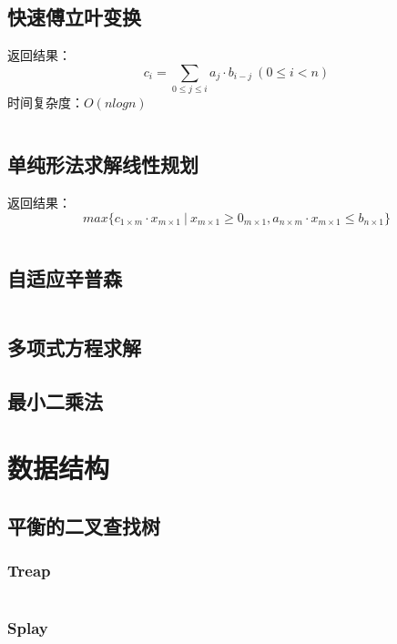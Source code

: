 \documentclass[a4paper]{article}
\newcommand{\cppcode}[1]{
    \inputminted[mathescape]{cpp}{source/#1}
}
\begin{document}
\subsection{快速傅立叶变换}

返回结果：$$c_i=\sum_{0 \leq j \leq i} a_j \cdot b_{i-j} \ (0 \leq i < n)$$
\indent 时间复杂度：$O(n log n)$

\cppcode{numerical-algorithm/fast-fourier-transform.cpp}

\subsection{单纯形法求解线性规划}

返回结果：$$max\{c_{1 \times m} \cdot x_{m \times 1} \ | \ x_{m \times 1} \geq 0_{m \times 1}, a_{n \times m} \cdot x_{m \times 1} \leq b_{n \times 1}\}$$

\cppcode{numerical-algorithm/linear-programming-simplex.cpp}

\subsection{自适应辛普森}

\cppcode{numerical-algorithm/adaptive-simpson.cpp}

\subsection{多项式方程求解}

\subsection{最小二乘法}

\section{数据结构}

\subsection{平衡的二叉查找树}

\subsubsection{Treap}

\cppcode{data-structure/treap.cpp}

\subsubsection{Splay}
\end{document}
